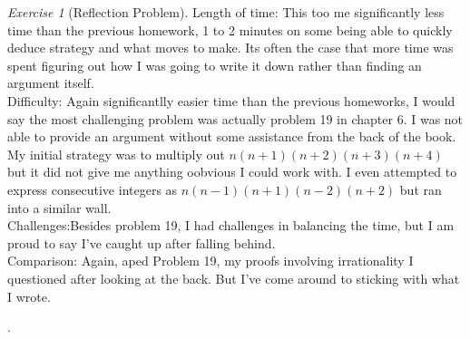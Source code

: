 \documentclass[12pt]{amsart}
\makeatletter
\theoremstyle{remark}
\newtheorem*{exercise}{Exercise}%
\renewenvironment{proof}[1][\proofname]{\par\doublespacing
  \pushQED{\qed}%
  \normalfont \topsep6\p@\@plus6\p@\relax
  \list{}{%
    \settowidth{\leftmargin}{\itshape\proofname:\hskip\labelsep}%
    \setlength{\labelwidth}{0pt}%
    \setlength{\itemindent}{-\leftmargin}%
  }%
  \item[\hskip\labelsep\itshape#1\@addpunct{:}]\ignorespaces
}{%
  \popQED\endlist\@endpefalse
  \singlespacing
}
\theoremstyle{mycomment}
\makeatother
\begin{document}
\begin{exercise}[Reflection Problem]
\begin{proof} 
Length of time: This too me significantly less time than the previous homework, 1 to 2 minutes on some being able to quickly deduce strategy and what moves to make. Its often the case that more time was spent figuring out how I was going to write it down rather than finding an argument itself. \\

Difficulty: Again significantlly easier time than the previous homeworks, I would say the most challenging problem was actually problem 19 in chapter 6. I was not able to provide an argument without some assistance from the back of the book. My initial strategy was to multiply out $n(n+1)(n+2)(n+3)(n+4)$ but it did not give me anything oobvious I could work with. I even attempted to express consecutive integers as $n(n-1)(n+1)(n-2)(n+2)$ but ran into a similar wall. \\

Challenges:Besides problem 19, I had challenges in balancing the time, but I am proud to say I've caught up after falling behind. \\

Comparison: Again, aped Problem 19, my proofs involving irrationality I questioned after looking at the back. But I've come around to sticking with what I wrote.
\end{proof}
\end{exercise}.















 
\end{document}
